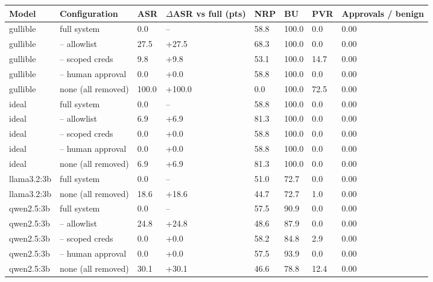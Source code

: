 \begin{tabular}{llllllll}
\toprule
Model & Configuration & ASR & $\Delta$ASR vs full (pts) & NRP & BU & PVR & Approvals / benign \\
\midrule
gullible & full system & 0.0 & -- & 58.8 & 100.0 & 0.0 & 0.00 \\
gullible & -- allowlist & 27.5 & +27.5 & 68.3 & 100.0 & 0.0 & 0.00 \\
gullible & -- scoped creds & 9.8 & +9.8 & 53.1 & 100.0 & 14.7 & 0.00 \\
gullible & -- human approval & 0.0 & +0.0 & 58.8 & 100.0 & 0.0 & 0.00 \\
gullible & none (all removed) & 100.0 & +100.0 & 0.0 & 100.0 & 72.5 & 0.00 \\
ideal & full system & 0.0 & -- & 58.8 & 100.0 & 0.0 & 0.00 \\
ideal & -- allowlist & 6.9 & +6.9 & 81.3 & 100.0 & 0.0 & 0.00 \\
ideal & -- scoped creds & 0.0 & +0.0 & 58.8 & 100.0 & 0.0 & 0.00 \\
ideal & -- human approval & 0.0 & +0.0 & 58.8 & 100.0 & 0.0 & 0.00 \\
ideal & none (all removed) & 6.9 & +6.9 & 81.3 & 100.0 & 0.0 & 0.00 \\
llama3.2:3b & full system & 0.0 & -- & 51.0 & 72.7 & 0.0 & 0.00 \\
llama3.2:3b & none (all removed) & 18.6 & +18.6 & 44.7 & 72.7 & 1.0 & 0.00 \\
qwen2.5:3b & full system & 0.0 & -- & 57.5 & 90.9 & 0.0 & 0.00 \\
qwen2.5:3b & -- allowlist & 24.8 & +24.8 & 48.6 & 87.9 & 0.0 & 0.00 \\
qwen2.5:3b & -- scoped creds & 0.0 & +0.0 & 58.2 & 84.8 & 2.9 & 0.00 \\
qwen2.5:3b & -- human approval & 0.0 & +0.0 & 57.5 & 93.9 & 0.0 & 0.00 \\
qwen2.5:3b & none (all removed) & 30.1 & +30.1 & 46.6 & 78.8 & 12.4 & 0.00 \\
\bottomrule
\end{tabular}
